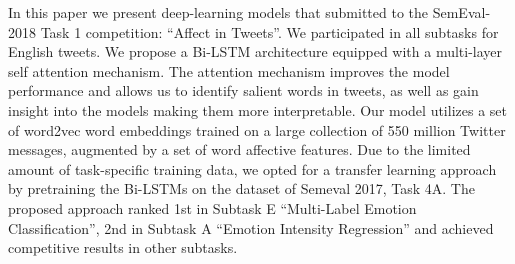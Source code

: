In this paper we present deep-learning models that submitted to the SemEval-2018 Task 1 competition: ``Affect in Tweets''. We participated in all subtasks for English tweets. We propose a Bi-LSTM architecture equipped with a multi-layer self attention mechanism. The attention mechanism improves the model performance and allows us to identify salient words in tweets, as well as gain insight into the models making them more interpretable. Our model utilizes a set of word2vec word embeddings trained on a large collection of 550 million Twitter messages, augmented by a set of word affective features. Due to the limited amount of task-specific training data, we opted for a transfer learning approach by pretraining the Bi-LSTMs on the dataset of Semeval 2017, Task 4A. The proposed approach ranked 1st in Subtask E ``Multi-Label Emotion Classification'',  2nd in Subtask A ``Emotion Intensity Regression'' and achieved competitive results in other subtasks.
